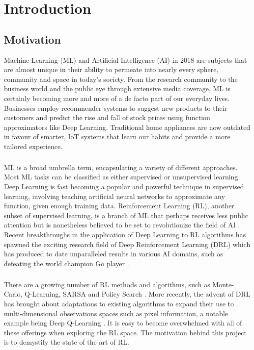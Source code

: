 \chapter{Introduction}

\section{Motivation}
Machine Learning (ML) and Artificial Intelligence (AI) in 2018 are subjects that are almost unique in their ability to permeate into nearly every sphere, community and space in today's society. From the research community to the business world and the public eye through extensive media coverage, ML is certainly becoming more and more of a de facto part of our everyday lives. Businesses employ recommender systems to suggest new products to their customers and predict the rise and fall of stock prices using function approximators like Deep Learning. Traditional home appliances are now outdated in favour of smarter, IoT systems that learn our habits and provide a more tailored experience. \paragraph{}

ML is a broad umbrella term, encapsulating a variety of different approaches. Most ML tasks can be classified as either supervised or unsupervised learning. Deep Learning is fast becoming a popular and powerful technique in supervised learning, involving teaching artificial neural networks to approximate any function, given enough training data. Reinforcement Learning (RL), another subset of supervised learning, is a branch of ML that perhaps receives less public attention but is nonetheless believed to be set to revolutionize the field of AI \cite{survey-drl}. Recent breakthroughs in the application of Deep Learning to RL algorithms has spawned the exciting research field of Deep Reinforcement Learning (DRL) which has produced to date unparalleled results in various AI domains, such as defeating the world champion Go player \cite{44806}. \paragraph{}

There are a growing number of RL methods and algorithms, such as Monte-Carlo, Q-Learning, SARSA and Policy Search \cite{sutton1998reinforcement}. More recently, the advent of DRL has brought about adaptations to existing algorithms to expand their use to multi-dimensional observations spaces such as pixel information, a notable example being Deep Q-Learning \cite{deepmind1}. It is easy to become overwhelmed with all of these offerings when exploring the RL space. The motivation behind this project is to demystify the state of the art of RL. \paragraph{}

